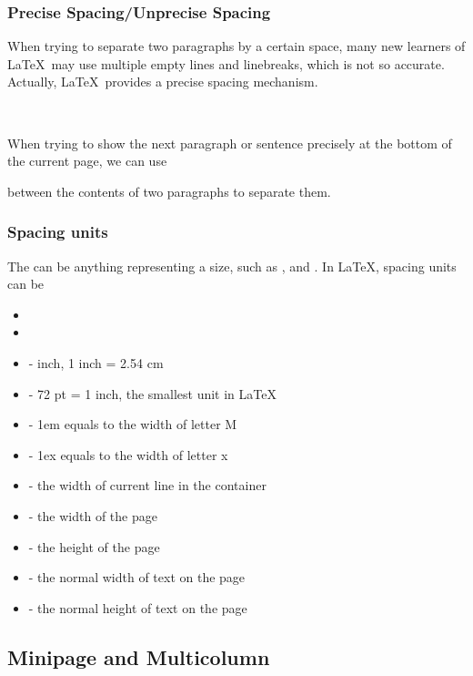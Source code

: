 \begin{frame}[fragile]
	\frametitle{Precise Spacing/Unprecise Spacing}
	When trying to separate two paragraphs by a certain space, many new learners of \LaTeX\ may use multiple empty lines and linebreaks, which is not so accurate. Actually, \LaTeX\ provides a precise spacing mechanism.
	\begin{command}
		\texttt{\vspace{space}}\\
		\texttt{\vspace*{space}}
	\end{command}
	When trying to show the next paragraph or sentence precisely at the bottom of the current page, we can use
	\begin{command}
		\texttt{\vfill}
	\end{command}
	between the contents of two paragraphs to separate them.
\end{frame}

\begin{frame}
	\frametitle{Spacing units}
	The  can be anything representing a size, such as \structure{1cm}, \structure{2em} and \structure{10pt}. In \LaTeX, spacing units can be
	\begin{itemize}
		\item {}
		\item {}
		\item {} - inch, 1 inch = 2.54 cm
		\item {} - 72 pt = 1 inch, the smallest unit in \LaTeX
		\item {} - 1em equals to the width of letter M
		\item {} - 1ex equals to the width of letter x
		\item {} - the width of current line in the container
		\item {} - the width of the page
		\item {} - the height of the page
		\item {} - the normal width of text on the page
		\item {} - the normal height of text on the page
	\end{itemize}
\end{frame}

\subsection{Minipage and Multicolumn}

